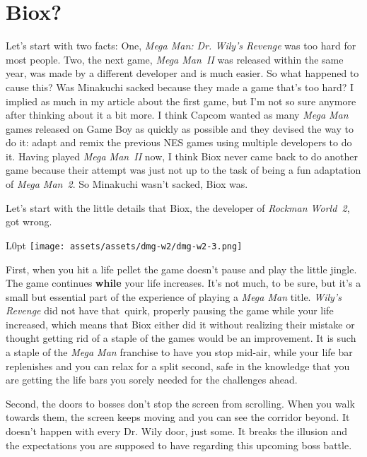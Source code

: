 \documentclass{book}
\begin{document}
\FloatBarrier\needspace{10mm}\section*{Biox?}\nopagebreak[4]

Let’s start with two facts: One, \emph{Mega Man: Dr. Wily’s Revenge} was too hard for most people. Two, the next game, \emph{Mega Man~II} was released within the same year, was made by a different developer and is much easier. So what happened to cause this? Was Minakuchi sacked because they made a game that’s too hard? I implied as much in my article about the first game, but I’m not so sure anymore after thinking about it a bit more. I think Capcom wanted as many \emph{Mega Man} games released on Game Boy as quickly as possible and they devised the way to do it: adapt and remix the previous NES games using multiple developers to do it. Having played \emph{Mega Man~II} now, I think Biox never came back to do another game because their attempt was just not up to the task of being a fun adaptation of \emph{Mega Man~2}. So Minakuchi wasn’t sacked, Biox was.

Let’s start with the little details that Biox, the developer of \emph{Rockman World~2}, got wrong.

\begin{wrapfigure}{L}{0pt} \texttt{[image: assets/assets/dmg-w2/dmg-w2-3.png]}\end{wrapfigure}
First, when you hit a life pellet the game doesn’t pause and play the little jingle. The game continues \textbf{while} your life increases. It’s not much, to be sure, but it’s a small but essential part of the experience of playing a \emph{Mega Man} title. \emph{Wily’s Revenge} did not have that~quirk, properly pausing the game while your life increased, which means that Biox either did it without realizing their mistake or thought getting rid of a staple of the games would be an improvement. It is such a staple of the \emph{Mega Man} franchise to have you stop mid-air, while your life bar replenishes and you can relax for a split second, safe in the knowledge that you are getting the life bars you sorely needed for the challenges ahead.

Second, the doors to bosses don’t stop the screen from scrolling. When you walk towards them, the screen keeps moving and you can see the corridor beyond. It doesn’t happen with every Dr. Wily door, just some. It breaks the illusion and the expectations you are supposed to have regarding this upcoming boss battle.
\end{document}
